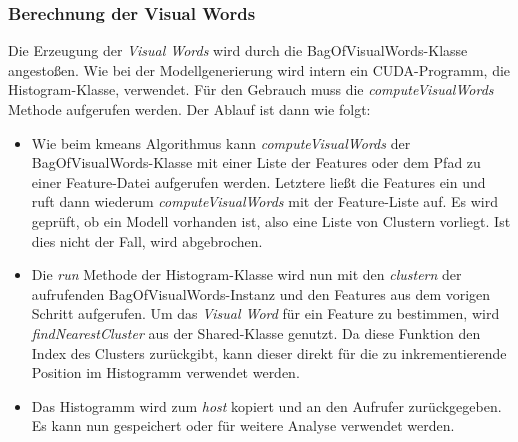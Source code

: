 \subsubsection{Berechnung der Visual Words}

Die Erzeugung der \textit{Visual Words} wird durch die BagOfVisualWords-Klasse angestoßen. Wie bei der Modellgenerierung wird intern ein CUDA-Programm, die Histogram-Klasse, verwendet. Für den Gebrauch muss die \textit{computeVisualWords} Methode aufgerufen werden. Der Ablauf ist dann wie folgt:

\begin{itemize}
	\item Wie beim kmeans Algorithmus kann \textit{computeVisualWords} der BagOfVisualWords-Klasse mit einer Liste der Features oder dem Pfad zu einer Feature-Datei aufgerufen werden. Letztere ließt die Features ein und ruft dann wiederum \textit{computeVisualWords} mit der Feature-Liste auf. Es wird geprüft, ob ein Modell vorhanden ist, also eine Liste von Clustern vorliegt. Ist dies nicht der Fall, wird abgebrochen.
	\item Die \textit{run} Methode der Histogram-Klasse wird nun mit den \textit{clustern} der aufrufenden BagOfVisualWords-Instanz und den Features aus dem vorigen Schritt aufgerufen. Um das \textit{Visual Word} für ein Feature zu bestimmen, wird \textit{findNearestCluster} aus der Shared-Klasse genutzt. Da diese Funktion den Index des Clusters zurückgibt, kann dieser direkt für die zu inkrementierende Position im Histogramm verwendet werden.
	\item Das Histogramm wird zum \textit{host} kopiert und an den Aufrufer zurückgegeben. Es kann nun gespeichert oder für weitere Analyse verwendet werden.
\end{itemize}